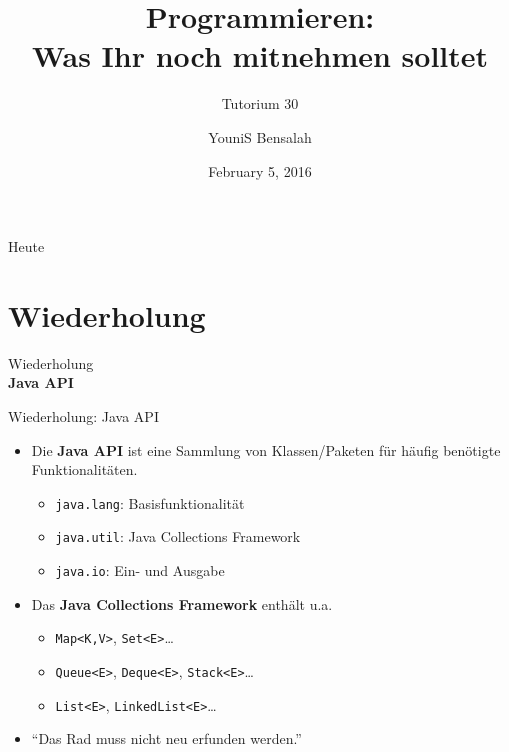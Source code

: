 \documentclass[18pt]{beamer}
\title[Was Ihr noch mitnehmen solltet]{Programmieren:\\ Was Ihr noch mitnehmen solltet}
\subtitle{Tutorium 30}
\author{YouniS Bensalah}
\date{February 5, 2016}
\institute{Chair for Software Design and Quality}
\newcommand{\quotes}[1]{``#1''}
\begin{document}

\begin{frame}
\titlepage
\end{frame}

\begin{frame}{Heute}
\tableofcontents
\end{frame}

\section{Wiederholung}

\begin{frame}{\quad}
    \center
    \Huge{Wiederholung\\ \textbf{Java API}}
\end{frame}

\begin{frame}{Wiederholung: Java API}
    \begin{itemize}
        \item Die \textbf{Java API} ist eine Sammlung von Klassen/Paketen für häufig benötigte Funktionalitäten.

        \begin{itemize}
            \item \texttt{java.lang}: Basisfunktionalität
            \item \texttt{java.util}: Java Collections Framework
            \item \texttt{java.io}: Ein- und Ausgabe
        \end{itemize}

        \vspace{.2in}

        \item Das \textbf{Java Collections Framework} enthält u.a.
        \begin{itemize}
            \item \texttt{Map<K,V>}, \texttt{Set<E>}\dots
            \item \texttt{Queue<E>}, \texttt{Deque<E>}, \texttt{Stack<E>}\dots
            \item \texttt{List<E>}, \texttt{LinkedList<E>}\dots
        \end{itemize}

        \vspace{.2in}

        \item \quotes{Das Rad muss nicht neu erfunden werden.}

    \end{itemize}
\end{frame}
\end{document}
